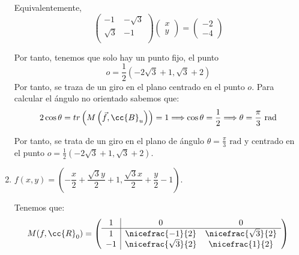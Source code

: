 \begin{ejercicio}
\begin{enumerate}
        Equivalentemente,
        \begin{equation*}
            \left(
            \begin{array}{cc}
                -1 & -\sqrt{3} \\
                \sqrt{3} & -1 \\
            \end{array}
            \right)
            \left(
            \begin{array}{c}
                x\\y
            \end{array}
            \right)
            = \left(
            \begin{array}{c}
                -2\\-4
            \end{array}
            \right)
        \end{equation*}

        Por tanto, tenemos que solo hay un punto fijo, el punto $$o=\frac{1}{2}(-2\sqrt{3}+1,\sqrt{3}+2)$$ Por tanto, se traza de un giro en el plano centrado en el punto $o$. Para calcular el ángulo no orientado sabemos que:
        \begin{equation*}
            2\cos\theta = tr\left(M\left(\vec{f}, \cc{B}_u\right)\right) = 1 \Longrightarrow \cos\theta = \frac{1}{2} \Longrightarrow \theta =\frac{\pi}{3}\text{ rad}
        \end{equation*}

        Por tanto, se trata de un giro en el plano de ángulo $\theta =\frac{\pi}{3}\text{ rad}$ y centrado en el punto $o=\frac{1}{2}(-2\sqrt{3}+1,\sqrt{3}+2)$.


        
        \item $f\left(x, y\right) = \left(-\dfrac{x}{2} + \dfrac{\sqrt{3}y}{2} + 1,\dfrac{\sqrt{3} x}{2} + \dfrac{y}{2} - 1\right).$

        Tenemos que:
        \begin{equation*}
            M(f,\cc{R}_0) = \left(
            \begin{array}{c|cc}
                1 & 0 & 0 \\ \hline
                1 & \nicefrac{-1}{2} & \nicefrac{\sqrt{3}}{2} \\
                -1 & \nicefrac{\sqrt{3}}{2} & \nicefrac{1}{2} \\
            \end{array}
            \right)
        \end{equation*}


\end{enumerate}
\end{ejercicio}
